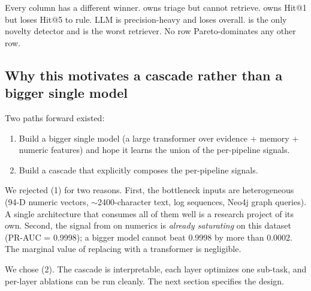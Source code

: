 Every column has a different winner. \hgb{} owns triage but cannot retrieve. \bienc{} owns Hit@1 but loses Hit@5 to \hrrf{} rule. \hrrf{} LLM is precision-heavy and loses overall. \agent{} is the only novelty detector and is the worst retriever. No row Pareto-dominates any other row.

\subsection{Why this motivates a cascade rather than a bigger single model}

Two paths forward existed:

\begin{enumerate}
\item Build a bigger single model (a large transformer over evidence + memory + numeric features) and hope it learns the union of the per-pipeline signals.
\item Build a cascade that explicitly composes the per-pipeline signals.
\end{enumerate}

We rejected (1) for two reasons. First, the bottleneck inputs are heterogeneous (94-D numeric vectors, $\sim$2400-character text, log sequences, Neo4j graph queries). A single architecture that consumes all of them well is a research project of its own. Second, the signal from \hgb{} on numerics is \emph{already saturating} on this dataset (PR-AUC = 0.9998); a bigger model cannot beat 0.9998 by more than 0.0002. The marginal value of replacing \hgb{} with a transformer is negligible.

We chose (2). The cascade is interpretable, each layer optimizes one sub-task, and per-layer ablations can be run cleanly. The next section specifies the design.
